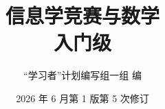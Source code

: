 \documentclass[a4paper,12pt]{book}
\begin{document}
\author{“学习者”计划编写组一组 \quad 编}
\title{信息学竞赛与数学 \\ {\small 入门级}}
\date{2026 年 6 月第 1 版第 5 次修订}

\maketitle
\tableofcontents

\frontmatter


\mainmatter






\appendix


\backmatter

\end{document}
